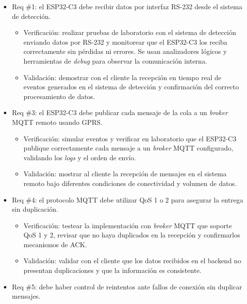 \documentclass[
11pt, %
]{charter}
\begin{document}
\begin{itemize} 

\item Req \#1: el ESP32-C3 debe recibir datos por interfaz RS-232 desde el sistema de detección.

\begin{itemize}
	\item Verificación: realizar pruebas de laboratorio con el sistema de detección enviando datos por RS-232 y monitorear que el ESP32-C3 los reciba correctamente sin pérdidas ni errores. Se usan analizadores lógicos y herramientas de \textit{debug} para observar la comunicación interna.
	\item Validación: demostrar con el cliente la recepción en tiempo real de eventos generados en el sistema de detección y confirmación del correcto procesamiento de datos.
\end{itemize}

\item Req \#3: el ESP32-C3 debe publicar cada mensaje de la cola a un \textit{broker} MQTT remoto usando GPRS.

\begin{itemize}
	\item Verificación: simular eventos y verificar en laboratorio que el ESP32-C3 publique correctamente cada mensaje a un \textit{broker} MQTT configurado, validando los \textit{logs} y el orden de envío.
	\item Validación: mostrar al cliente la recepción de mensajes en el sistema remoto bajo diferentes condiciones de conectividad y volumen de datos.
\end{itemize}

\item Req \#4: el protocolo MQTT debe utilizar QoS 1 o 2 para asegurar la entrega sin duplicación.

\begin{itemize}
	\item Verificación: testear la implementación con \textit{broker} MQTT que soporte QoS 1 y 2, revisar que no haya duplicados en la recepción y confirmarlos mecanismos de ACK.
	\item Validación: validar con el cliente que los datos recibidos en el backend no presentan duplicaciones y que la información es consistente.
\end{itemize}

\item Req \#5: debe haber control de reintentos ante fallos de conexión sin duplicar mensajes.


\end{itemize}
\end{document}
